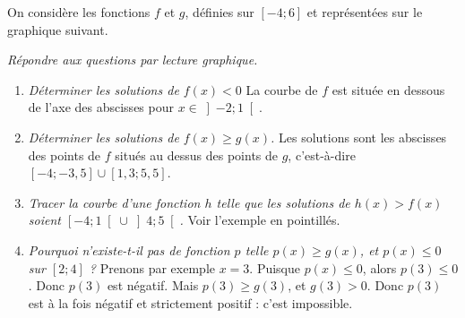 \documentclass[12pt]{article}
\begin{document}
\begin{exercice}
  On considère les fonctions $f$ et $g$, définies sur $\left[ -4;6 \right]$ et
  représentées sur le graphique suivant.
  \begin{center}
  \end{center}
  \emph{Répondre aux questions par lecture graphique.}
  \begin{enumerate}
    \item \emph{Déterminer les solutions de $f(x)<0$} La courbe de $f$ est située en dessous de l'axe des abscisses pour $x\in\left] -2;1 \right[$.
    \item \emph{Déterminer les solutions de $f(x)\geq g(x)$.} Les solutions sont les abscisses des points de $f$ situés au dessus des points de $g$, c'est-à-dire $\left[-4;-3,5 \right]\cup\left[1,3;5,5 \right]$.
    \item \emph{Tracer la courbe d'une fonction $h$ telle que les solutions de $h(x)>f(x)$ soient $\left[ -4;1 \right[ \cup \left] 4;5 \right[$.} Voir l'exemple en pointillés.
      \item \emph{Pourquoi n'existe-t-il pas de fonction $p$ telle $p(x) \geq g(x)$, et $p(x)\leq0$ sur $\left[ 2;4 \right]$ ?} Prenons par exemple $x=3$. Puisque $p(x)\leq0$, alors $p(3)\leq0$. Donc $p(3)$ est négatif. Mais $p(3)\geq g(3)$, et $g(3)>0$. Donc $p(3)$ est à la fois négatif et strictement positif : c'est impossible.
  \end{enumerate}

\end{exercice}
\end{document}

